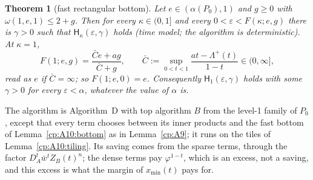 \documentclass[11pt]{article}
\newtheorem{theorem}{Theorem}[section]
\theoremstyle{definition}
\theoremstyle{remark}
\providecommand{\eps}{\varepsilon}
\newcommand{\Hypk}[1]{\mathsf{H}_{#1}}        %
\newcommand{\ZB}{Z_B}                         %
\newcommand{\Lamp}{\Lambda^{+}}               %
\newcommand{\AlgD}{Algorithm~D}                             %
\newcommand{\xmin}{x_{\min}}                  %
\newcommand{\Pzero}{P_0}                      %
\begin{document}
\begin{theorem}[fast rectangular bottom]\label{cp:A10}
Let $e\in(\alpha(\Pzero),1)$ and $g\ge0$ with $\omega(1,e,1)\le2+g$. Then for every $\kappa\in(0,1]$ and every $0<\eps<F(\kappa;e,g)$ there is $\gamma>0$ such that $\Hypk\kappa(\eps,\gamma)$ holds (time model; the algorithm is deterministic). At $\kappa=1$,
\[
F(1;e,g)=\frac{\bar Ce+ag}{\bar C+g},\qquad\bar C:=\sup_{0<t<1}\frac{at-\Lamp(t)}{1-t}\in(0,\infty],
\]
read as $e$ if $\bar C=\infty$; so $F(1;e,0)=e$. Consequently $\Hypk1(\eps,\gamma)$ holds with some $\gamma>0$ for every $\eps<\alpha$, whatever the value of $\alpha$ is.
\end{theorem}

The algorithm is \AlgD{} with top algorithm $B$ from the level-1 family of $\Pzero$, except that every term chooses between its inner products and the fast bottom of Lemma~\ref{cp:A10:bottom} as in Lemma~\ref{cp:A9}; it runs on the tiles of Lemma~\ref{cp:A10:tiling}. Its saving comes from the sparse terms, through the factor $D_A^t\bar w^t\ZB(t)^n$; the dense terms pay $\varphi^{1-t}$, which is an excess, not a saving, and this excess is what the margin of $\xmin(t)$ pays for.
\end{document}
